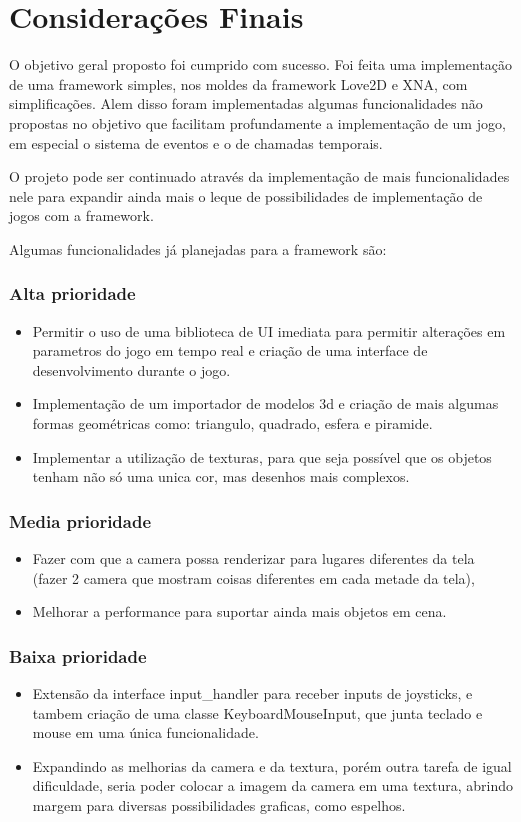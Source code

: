 \chapter{Considerações Finais}

O objetivo geral proposto foi cumprido com sucesso. Foi feita uma implementação de uma framework simples, nos moldes da framework Love2D e XNA, com simplificações. Alem disso foram implementadas algumas funcionalidades não propostas no objetivo que facilitam profundamente a implementação de um jogo, em especial o sistema de eventos e o de chamadas temporais.

O projeto pode ser continuado através da implementação de mais funcionalidades nele para expandir ainda mais o leque de possibilidades de implementação de jogos com a framework.

Algumas funcionalidades já planejadas para a framework são:

\subsection{Alta prioridade}
\begin{itemize}
  \item Permitir o uso de uma biblioteca de UI imediata para permitir alterações em parametros do jogo em tempo real e criação de uma interface de desenvolvimento durante o jogo.
  \item Implementação de um importador de modelos 3d e criação de mais algumas formas geométricas como: triangulo, quadrado, esfera e piramide.
  \item Implementar a utilização de texturas, para que seja possível que os objetos tenham não só uma unica cor, mas desenhos mais complexos.
\end{itemize}

\subsection{Media prioridade}
\begin{itemize}
  \item Fazer com que a camera possa renderizar para lugares diferentes da tela (fazer 2 camera que mostram coisas diferentes em cada metade da tela),
  \item Melhorar a performance para suportar ainda mais objetos em cena.
\end{itemize}

\subsection{Baixa prioridade}
\begin{itemize}
  \item Extensão da interface input\_handler para receber inputs de joysticks, e tambem criação de uma classe KeyboardMouseInput, que junta teclado e mouse em uma única funcionalidade.
  \item Expandindo as melhorias da camera e da textura, porém outra tarefa de igual dificuldade, seria poder colocar a imagem da camera em uma textura, abrindo margem para diversas possibilidades graficas, como espelhos.
\end{itemize}